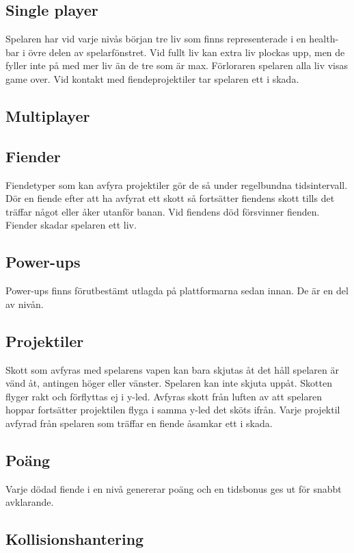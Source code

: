 \documentclass{TDP005mall}
\begin{document}
\subsection{Single player}
Spelaren har vid varje nivås början tre liv som finns representerade i en health-bar i övre delen av spelarfönstret. Vid fullt liv kan extra liv plockas upp, men de fyller inte på med mer liv än de tre som är max. Förloraren spelaren alla liv visas game over. Vid kontakt med fiendeprojektiler tar spelaren ett i skada.

\subsection{Multiplayer} %


\subsection{Fiender}
Fiendetyper som kan avfyra projektiler gör de så under regelbundna tidsintervall. Dör en fiende efter att ha avfyrat ett skott så fortsätter fiendens skott tills det träffar något eller åker utanför banan. Vid fiendens död försvinner fienden. Fiender skadar spelaren ett liv.

\subsection{Power-ups}
Power-ups finns förutbestämt utlagda på plattformarna sedan innan. De är en del av nivån.

\subsection{Projektiler}
Skott som avfyras med spelarens vapen kan bara skjutas åt det håll spelaren är vänd åt, antingen höger eller vänster. Spelaren kan inte skjuta uppåt. Skotten flyger rakt och förflyttas ej i y-led. Avfyras skott från luften av att spelaren hoppar fortsätter projektilen flyga i samma y-led det sköts ifrån. Varje projektil avfyrad från spelaren som träffar en fiende åsamkar ett i skada.

\subsection{Poäng}
Varje dödad fiende i en nivå genererar poäng och en tidsbonus ges ut för snabbt avklarande. 

\subsection{Kollisionshantering}
\end{document}

